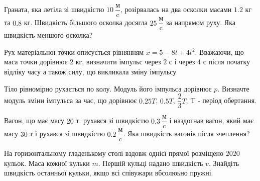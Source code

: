 \begin{problem}{3}
	Граната, яка летіла зі швидкістю $10~\dfrac{\text{м}}{\text{c}}$, розірвалась на два осколки масами $1.2$ кг та $0.8$ кг. Швидкість більшого осколка досягла $25~\dfrac{\text{м}}{\text{c}}$ за напрямом руху. Яка швидкість меншого осколка?
\end{problem}

\begin{problem}{6}
	Рух матеріальної точки описується рівнянням $x = 5-8t+4t^2$. Вважаючи, що маса точки дорівнює $2$ кг, визначити імпульс через $2$ с і через $4$ с після початку відліку часу а також силу, що викликала зміну імпульсу
\end{problem}

\begin{problem}{11}
	Тіло рівномірно рухається по колу. Модуль його імпульса дорівнює $p$. Визначте модуль зміни імпульса за час, що дорівнює $0.25T$, $0.5T$, $\dfrac{2}{3}T$, T - період обертання.
\end{problem}

\begin{problem}{12}
	Вагон, що має масу $20$ т. рухався зі швидкістю $0.3~\dfrac{\text{м}}{\text{c}}$ і наздогнав вагон, який має масу $30$ т і рухався зі швидкістю $0.2~\dfrac{\text{м}}{\text{c}}$. Яка швидкість вагонів після зчеплення?
\end{problem}

\begin{problem}{14}
	На горизонтальному гладенькому столі вздовж однієї прямої розміщено $2020$ кульок. Маса кожної кульки $m$. Першій кульці надано швидкість $v$. Знайдіть швидкість останньої кульки, якщо всі співужари вбсолюьно пружні.
\end{problem}